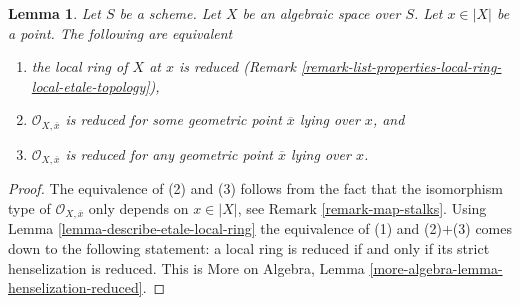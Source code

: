 \documentclass[10pt,a4paper]{amsart}
\theoremstyle{plain}
\newtheorem{lemma}[subsection]{Lemma}
\theoremstyle{definition}
\theoremstyle{remark}
\numberwithin{equation}{subsection}
\begin{document}
\begin{lemma}
\label{lemma-reduced-local-ring}
Let $S$ be a scheme. Let $X$ be an algebraic space over $S$.
Let $x \in |X|$ be a point. The following are equivalent
\begin{enumerate}
\item the local ring of $X$ at $x$ is reduced
(Remark \ref{remark-list-properties-local-ring-local-etale-topology}),
\item $\mathcal{O}_{X, \overline{x}}$ is reduced for some geometric
point $\overline{x}$ lying over $x$, and
\item $\mathcal{O}_{X, \overline{x}}$ is reduced for any geometric
point $\overline{x}$ lying over $x$.
\end{enumerate}
\end{lemma}

\begin{proof}
The equivalence of (2) and (3) follows from the fact that the
isomorphism type of $\mathcal{O}_{X, \overline{x}}$ only depends
on $x \in |X|$, see Remark \ref{remark-map-stalks}.
Using Lemma \ref{lemma-describe-etale-local-ring}
the equivalence of (1) and (2)$+$(3) comes down to the
following statement: a local ring is reduced if and only if
its strict henselization is reduced. This is
More on Algebra, Lemma \ref{more-algebra-lemma-henselization-reduced}.
\end{proof}
\end{document}
